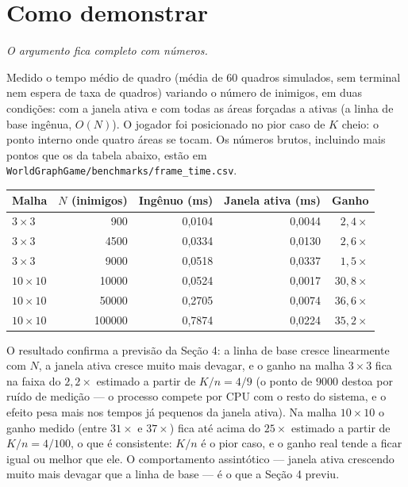 \documentclass[11pt,a4paper]{article}
\newcommand{\gancho}[1]{\textcolor{destaque}{\textit{#1}}\par}
\begin{document}
\section{Como demonstrar}

\gancho{O argumento fica completo com números.}

Medido o tempo médio de quadro (média de 60 quadros simulados, sem terminal
nem espera de taxa de quadros) variando o número de inimigos, em duas
condições: com a janela ativa e com todas as áreas forçadas a ativas (a linha
de base ingênua, $O(N)$). O jogador foi posicionado no pior caso de $K$ cheio:
o ponto interno onde quatro áreas se tocam. Os números brutos, incluindo mais
pontos que os da tabela abaixo, estão em \texttt{WorldGraphGame/benchmarks/frame\_time.csv}.

\begin{center}
\begin{tabular}{@{}lrrrr@{}}
\toprule
Malha & $N$ (inimigos) & Ingênuo (ms) & Janela ativa (ms) & Ganho \\
\midrule
$3\times3$  & 900    & 0,0104 & 0,0044 & $2{,}4\times$ \\
$3\times3$  & 4500   & 0,0334 & 0,0130 & $2{,}6\times$ \\
$3\times3$  & 9000   & 0,0518 & 0,0337 & $1{,}5\times$ \\
$10\times10$ & 10000  & 0,0524 & 0,0017 & $30{,}8\times$ \\
$10\times10$ & 50000  & 0,2705 & 0,0074 & $36{,}6\times$ \\
$10\times10$ & 100000 & 0,7874 & 0,0224 & $35{,}2\times$ \\
\bottomrule
\end{tabular}
\end{center}

O resultado confirma a previsão da Seção 4: a linha de base cresce
linearmente com $N$, a janela ativa cresce muito mais devagar, e o ganho na
malha $3\times3$ fica na faixa do $2{,}2\times$ estimado a partir de $K/n =
4/9$ (o ponto de $9000$ destoa por ruído de medição --- o processo compete
por CPU com o resto do sistema, e o efeito pesa mais nos tempos já pequenos
da janela ativa). Na malha $10\times10$ o ganho medido (entre $31\times$ e
$37\times$) fica até acima do $25\times$ estimado a partir de $K/n =
4/100$, o que é consistente: $K/n$ é o pior caso, e o ganho real tende a
ficar igual ou melhor que ele. O comportamento assintótico --- janela ativa
crescendo muito mais devagar que a linha de base --- é o que a Seção 4
previu.
\end{document}
